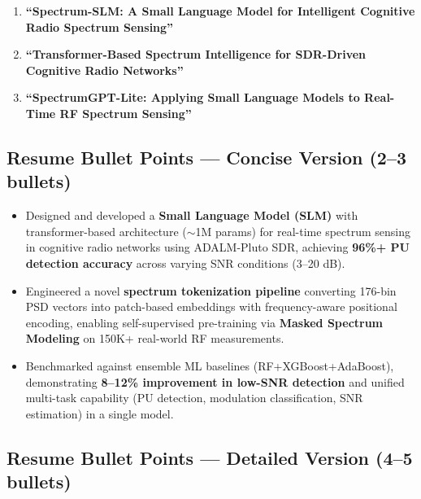 \documentclass[12pt, a4paper]{article}
\begin{document}
\begin{enumerate}[leftmargin=1.5em]
    \item \textbf{``Spectrum-SLM: A Small Language Model for Intelligent Cognitive Radio Spectrum Sensing''}
    \item \textbf{``Transformer-Based Spectrum Intelligence for SDR-Driven Cognitive Radio Networks''}
    \item \textbf{``SpectrumGPT-Lite: Applying Small Language Models to Real-Time RF Spectrum Sensing''}
\end{enumerate}


\subsection{Resume Bullet Points — Concise Version (2--3 bullets)}

\begin{keybox}
\begin{itemize}[leftmargin=1.5em, itemsep=6pt]
    \item Designed and developed a \textbf{Small Language Model (SLM)} with transformer-based architecture ($\sim$1M params) for real-time spectrum sensing in cognitive radio networks using ADALM-Pluto SDR, achieving \textbf{96\%+ PU detection accuracy} across varying SNR conditions (3--20 dB).

    \item Engineered a novel \textbf{spectrum tokenization pipeline} converting 176-bin PSD vectors into patch-based embeddings with frequency-aware positional encoding, enabling self-supervised pre-training via \textbf{Masked Spectrum Modeling} on 150K+ real-world RF measurements.

    \item Benchmarked against ensemble ML baselines (RF+XGBoost+AdaBoost), demonstrating \textbf{8--12\% improvement in low-SNR detection} and unified multi-task capability (PU detection, modulation classification, SNR estimation) in a single model.
\end{itemize}
\end{keybox}


\subsection{Resume Bullet Points — Detailed Version (4--5 bullets)}
\end{document}
